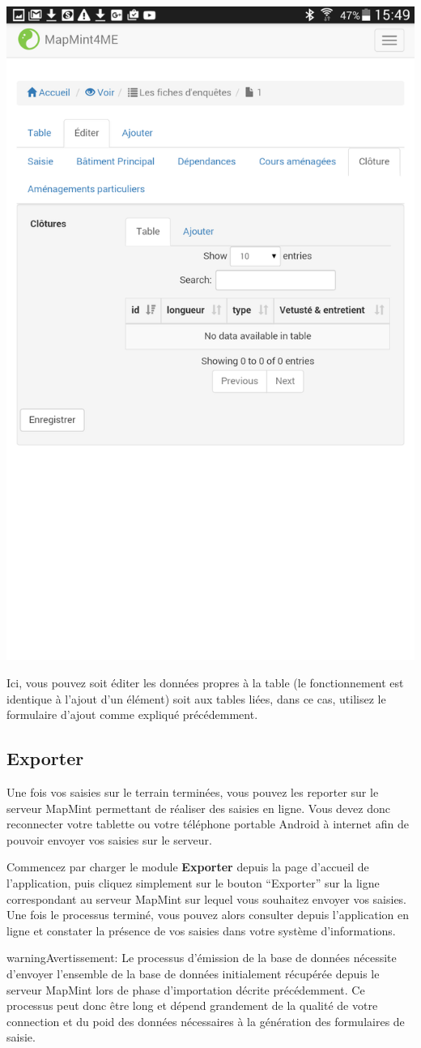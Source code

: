 \documentclass[letterpaper,10pt,french]{sphinxmanual}
\begin{document}
{\hfill\includegraphics[width=0.450\linewidth]{mm4me-view-edit.png}\hfill}

Ici, vous pouvez soit éditer les données propres à la table (le fonctionnement est identique à l'ajout d'un élément) soit aux tables liées, dans ce cas, utilisez le formulaire d'ajout comme expliqué précédemment.


\subsection{Exporter}
\label{tables/mapmint4me:exporter}
Une fois vos saisies sur le terrain terminées, vous pouvez les reporter sur le serveur MapMint permettant de réaliser des saisies en ligne. Vous devez donc reconnecter votre tablette ou votre téléphone portable Android à internet afin de pouvoir envoyer vos saisies sur le serveur.

Commencez par charger le module \textbf{Exporter} depuis la page d'accueil de l'application, puis cliquez simplement sur le bouton ``Exporter'' sur la ligne correspondant au serveur MapMint sur lequel vous souhaitez envoyer vos saisies. Une fois le processus terminé, vous pouvez alors consulter depuis l'application en ligne et constater la présence de vos saisies dans votre système d'informations.

\begin{notice}{warning}{Avertissement:}
Le processus d'émission de la base de données nécessite d'envoyer l'ensemble de la base de données initialement récupérée depuis le serveur MapMint lors de phase d'importation décrite précédemment. Ce processus peut donc être long et dépend grandement de la qualité de votre connection et du poid des données nécessaires à la génération des formulaires de saisie.
\end{notice}
\end{document}
